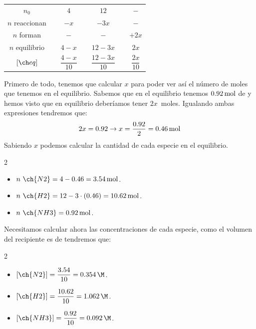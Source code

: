 \begin{example}
\begin{enumerate}[label=\letraminuscula]
\begin{table}[H]
\begin{tabular}{@{}c @{\,}c@{\,} c @{\,}c@{\,} c @{\,}c@{\,} c@{}}
                    \midrule
                    $ n_0 $ &  & $ 4 $ &  & $ 12 $ &  & $ - $ \\[3pt]
                    $ n $ reaccionan &  & $ -x $ &  & $ -3x $ &  & $ - $ \\[3pt]
                    $ n $ forman &  & $ - $ &  & $ - $ &  & $ +2x $ \\[3pt]
                    $ n $ equilibrio &  & $ 4-x $ &  & $ 12-3x $ &  & $ 2x $ \\[3pt]
                    $ \conc{eq} $ &  & $ \dfrac{4-x}{10} $ &  & $ \dfrac{12-3x}{10} $ &  & $ \dfrac{2x}{10} $ \\
                    \bottomrule
                \end{tabular}
            \end{table}


            Primero de todo, tenemos que calcular $x$ para poder ver así el número de moles que tenemos en el equilibrio.
            Sabemos que en el equilibrio tenemos $\SI{0.92}{\mole}$ de  y hemos visto que en equilibrio deberíamos tener $2x$\ moles.
            Igualando ambas expresiones tendremos que:
            \begin{gather*}
                2x = 0.92 \rightarrow x = \dfrac{0.92}{2} = \SI{0.46}{\mole}
            \end{gather*}
            Sabiendo \(x\) podemos calcular la cantidad de cada especie en el equilibrio.
            \begin{multicols}{2}
                \begin{itemize}
                    \item $n\ \ch{N2} = 4 - 0.46  =  \moles{3.54}$.
                    \item  $n\ \ch{H2} = 12 - 3\cdot (0.46)  =  \moles{10.62}$.
                    \item $n\ \ch{NH3} =  \moles{0.92}$.
                \end{itemize}
            \end{multicols}
            Necesitamos calcular ahora las concentraciones de cada especie, como el volumen del recipiente es de  tendremos que:

            \begin{multicols}{2}
                \begin{itemize}
                    \item $[\ch{N2}] = \dfrac{3.54}{10} = \SI{0.354}{\M}$.
                    \item $[\ch{H2}] = \dfrac{10.62}{10} = \SI{1.062}{\M}$.
                    \item $[\ch{NH3}] = \dfrac{0.92}{10} = \SI{0.092}{\M}$.
                \end{itemize}
            \end{multicols}


\end{enumerate}
\end{example}
